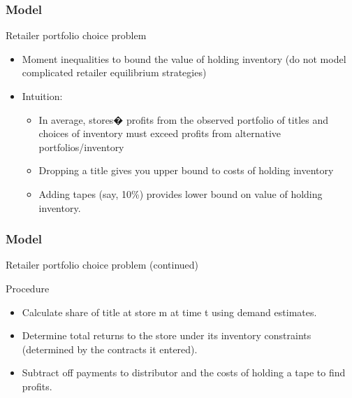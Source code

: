 \documentclass[notes=show]{beamer}
\begin{document}

\begin{frame}
\frametitle{Model}

Retailer portfolio choice problem

\begin{itemize}
\item Moment inequalities to bound the value of holding inventory (do not
model complicated retailer equilibrium strategies)

\item Intuition:

\begin{itemize}
\item In average, stores� profits from the observed portfolio of
titles and choices of inventory must exceed profits from alternative
portfolios/inventory

\item Dropping a title gives you upper bound to costs of holding inventory

\item Adding tapes (say, 10\%) provides lower bound on value of holding
inventory.
\end{itemize}

\end{itemize}
\end{frame}

\begin{frame}
\frametitle{Model}

Retailer portfolio choice problem (continued)

Procedure

\begin{itemize}
\item Calculate share of title at store m at time t using demand estimates.

\item Determine total returns to the store under its inventory constraints
(determined by the contracts it entered).

\item Subtract off payments to distributor and the costs of holding a tape
to find profits.
\end{itemize}
\end{frame}

\end{document}
